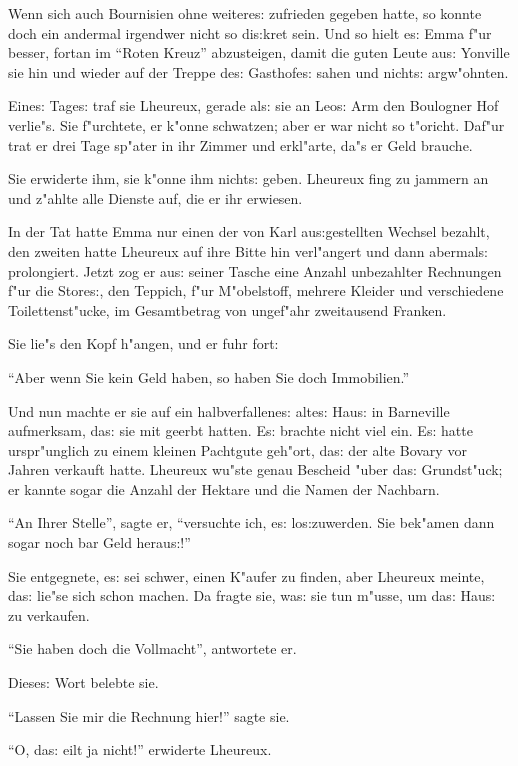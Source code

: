 \documentclass[oneside,12pt]{book}
\newcommand{\s}{s:}%
\begin{document}
Wenn sich auch Bournisien ohne weitere{\s} zufrieden gegeben
hatte, so konnte doch ein andermal irgendwer nicht so di{\s}kret
sein. Und so hielt e{\s} Emma f"ur besser, fortan im "`Roten
Kreuz"' abzusteigen, damit die guten Leute au{\s} Yonville sie hin
und wieder auf der Treppe de{\s} Gasthofe{\s} sahen und nicht{\s}
argw"ohnten.

Eine{\s} Tage{\s} traf sie Lheureux, gerade al{\s} sie an Leo{\s}
Arm den Boulogner Hof verlie"s. Sie f"urchtete, er k"onne
schwatzen; aber er war nicht so t"oricht. Daf"ur trat er drei Tage
sp"ater in ihr Zimmer und erkl"arte, da"s er Geld brauche.

Sie erwiderte ihm, sie k"onne ihm nicht{\s} geben. Lheureux fing
zu jammern an und z"ahlte alle Dienste auf, die er ihr erwiesen.

In der Tat hatte Emma nur einen der von Karl au{\s}gestellten
Wechsel bezahlt, den zweiten hatte Lheureux auf ihre Bitte hin
verl"angert und dann abermal{\s} prolongiert. Jetzt zog er au{\s}
seiner Tasche eine Anzahl unbezahlter Rechnungen f"ur die
Store{\s}, den Teppich, f"ur M"obelstoff, mehrere Kleider und
verschiedene Toilettenst"ucke, im Gesamtbetrag von ungef"ahr
zweitausend Franken.

Sie lie"s den Kopf h"angen, und er fuhr fort:

"`Aber wenn Sie kein Geld haben, so haben Sie doch Immobilien."'

Und nun machte er sie auf ein halbverfallene{\s} alte{\s} Hau{\s}
in Barneville aufmerksam, da{\s} sie mit geerbt hatten. E{\s}
brachte nicht viel ein. E{\s} hatte urspr"unglich zu einem kleinen
Pachtgute geh"ort, da{\s} der alte Bovary vor Jahren verkauft
hatte. Lheureux wu"ste genau Bescheid "uber da{\s} Grundst"uck; er
kannte sogar die Anzahl der Hektare und die Namen der Nachbarn.

"`An Ihrer Stelle"', sagte er, "`versuchte ich, e{\s}
lo{\s}zuwerden. Sie bek"amen dann sogar noch bar Geld herau{\s}!"'

Sie entgegnete, e{\s} sei schwer, einen K"aufer zu finden, aber
Lheureux meinte, da{\s} lie"se sich schon machen. Da fragte sie,
wa{\s} sie tun m"usse, um da{\s} Hau{\s} zu verkaufen.

"`Sie haben doch die Vollmacht"', antwortete er.

Diese{\s} Wort belebte sie.

"`Lassen Sie mir die Rechnung hier!"' sagte sie.

"`O, da{\s} eilt ja nicht!"' erwiderte Lheureux.
\end{document}
